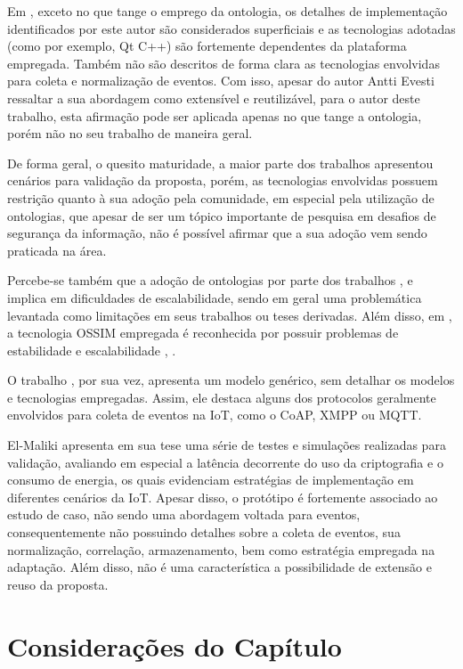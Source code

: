 \documentclass[tid,table]{texufpel} %
\begin{document}
Em \cite{evesti13c}, exceto no que tange o emprego da ontologia, os detalhes de implementação identificados por este autor são considerados superficiais e as tecnologias adotadas (como por exemplo, Qt C++) são fortemente dependentes da plataforma empregada. Também não são descritos de forma clara as tecnologias envolvidas para coleta e normalização de eventos. Com isso, apesar do autor Antti Evesti ressaltar a sua abordagem como extensível e reutilizável, para o autor deste trabalho, esta afirmação pode ser aplicada apenas no que tange a ontologia, porém não no seu trabalho de maneira geral.

De forma geral, o quesito maturidade, a maior parte dos trabalhos apresentou cenários para validação da proposta, porém, as tecnologias envolvidas possuem restrição quanto à sua adoção pela comunidade, em especial pela utilização de ontologias, que apesar de ser um tópico importante de pesquisa em desafios de segurança da informação, não é possível afirmar que a sua adoção vem sendo praticada na área.

Percebe-se também que a adoção de ontologias por parte dos trabalhos \cite{evesti13c}, \cite{aman14} e \cite{mozzaquatro16} implica em dificuldades de escalabilidade, sendo em geral uma problemática levantada como limitações em seus trabalhos ou teses derivadas. Além disso, em \cite{aman14}, a tecnologia OSSIM empregada é reconhecida por possuir problemas de estabilidade e escalabilidade \cite{gartner15}, \cite{infosecnirvana14}.

O trabalho \cite{ramos15}, por sua vez, apresenta um modelo genérico, sem detalhar os modelos e tecnologias empregadas. Assim, ele destaca alguns dos protocolos geralmente envolvidos para coleta de eventos na IoT, como o CoAP, XMPP ou MQTT.

El-Maliki apresenta em sua tese \cite{elmaliki14} uma série de testes e simulações realizadas para validação, avaliando em especial a latência decorrente do uso da criptografia e o consumo de energia, os quais evidenciam estratégias de implementação em diferentes cenários da IoT. Apesar disso, o protótipo é fortemente associado ao estudo de caso, não sendo uma abordagem voltada para eventos, consequentemente não possuindo detalhes sobre a coleta de eventos, sua normalização, correlação, armazenamento, bem como estratégia empregada na adaptação. Além disso, não é uma característica a possibilidade de extensão e reuso da proposta.


\section{Considerações do Capítulo}
\end{document}
